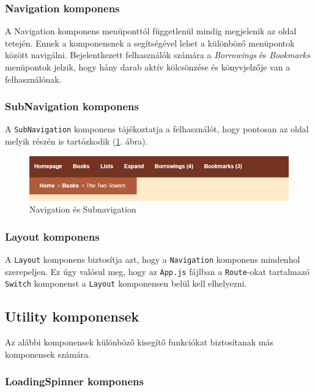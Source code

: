 \subsubsection{Navigation komponens}

A Navigation komponens menüponttól függetlenül mindig megjelenik az oldal tetején. Ennek a komponensnek a segítségével lehet a különböző menüpontok között navigálni. Bejelentkezett felhasználók számára a \textit{Borrowings} és \textit{Bookmarks} menüpontok jelzik, hogy hány darab aktív kölcsönzése és könyvjelzője van a felhasználónak. 

\subsubsection{SubNavigation komponens}

A \texttt{SubNavigation} komponens tájékoztatja a felhasználót, hogy pontosan az oldal melyik részén is tartózkodik (\ref{fig:navigation}. ábra).

\begin{figure}[h]
\centering
\includegraphics[scale=0.7]{images/application/navigation.png}
\caption{Navigation és Subnavigation}
\label{fig:navigation}
\end{figure}

\subsubsection{Layout komponens}

A \texttt{Layout} komponens biztosítja azt, hogy a \texttt{Navigation} komponens mindenhol szerepeljen. Ez úgy valósul meg, hogy az \texttt{App.js} fájlban a \texttt{Route}-okat tartalmazó \texttt{Switch} komponenst a \texttt{Layout} komponensen belül kell elhelyezni.

\subsection{Utility komponensek}

Az alábbi komponensek különböző kisegítő funkciókat biztosítanak más komponensek számára.

\subsubsection{LoadingSpinner komponens}

